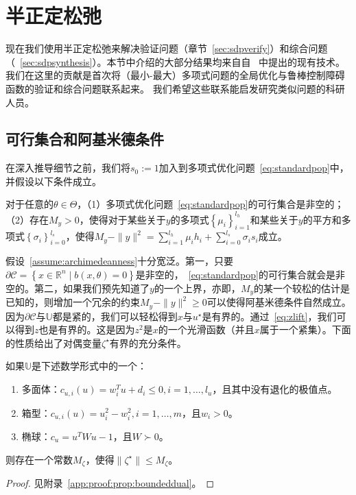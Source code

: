 
\chapter{半正定松弛}
\label{sec:sdprelax}

现在我们使用半正定松弛来解决验证问题（章节~\ref{sec:sdpverify}）和综合问题（~\ref{sec:sdpsynthesis}）。本节中介绍的大部分结果均来自自~\cite{lasserre01siopt-global,lasserre11jgo-minmaxpop} 中提出的现有技术。 我们在这里的贡献是首次将（最小-最大）多项式问题的全局优化与鲁棒控制障碍函数的验证和综合问题联系起来。 我们希望这些联系能启发研究类似问题的科研人员。

\section{可行集合和阿基米德条件}
在深入推导细节之前，我们将$s_0 := 1$加入到多项式优化问题~\eqref{eq:standardpop}中，并假设以下条件成立。
\begin{assumption}[可行性和阿基米德条件]\label{assume:archimedeanness}
    对于任意的$\theta \in \Theta$，（1）多项式优化问题~\eqref{eq:standardpop}的可行集合是非空的；（2）存在$M_y > 0$，使得对于某些关于$y$的多项式$\left\{ \mu_i \right\}_{i=1}^{l_h}$和某些关于$y$的平方和多项式$\left\{ \sigma_i \right\}_{i=0}^{l_s}$，使得$M_y - \parallel y \parallel^2 = \sum_{i=1}^{l_h} \mu_i h_i + \sum_{i=0}^{l_s} \sigma_i s_i$成立。
\end{assumption}

假设~\ref{assume:archimedeanness}十分宽泛。第一，只要$\partial \mathcal{C} = \left\{ x \in \mathbb{R}^n \mid b(x, \theta) = 0 \right\}$是非空的，~\eqref{eq:standardpop}的可行集合就会是非空的。第二，如果我们预先知道了$y$的一个上界，亦即，$M_y$的某一个较松的估计是已知的，则增加一个冗余的约束$M_y - \parallel y \parallel^2 \ge 0$可以使得阿基米德条件自然成立。因为$\partial \mathcal{C}$与$\mathbb{U}$都是紧的，我们可以轻松得到$x$与$u^\star$是有界的。通过~\eqref{eq:zlift}，我们可以得到$z$也是有界的。这是因为$z^2$是$x$的一个光滑函数（并且$x$属于一个紧集）。下面的性质给出了对偶变量$\zeta^\star$有界的充分条件。

\begin{proposition}\label{prop:boundeddual}
    如果$\mathbb{U}$是下述数学形式中的一个：
    \begin{enumerate}
        \item 多面体：$c_{u,i}(u) = w_i^T u + d_i \le 0, i = 1, \dots, l_u$，且其中没有退化的极值点。
        \item 箱型：$c_{u,i}(u) = u_i^2 - w_i^2, i = 1, \dots, m$，且$w_i > 0$。
        \item 椭球：$c_u = u^T W u - 1$，且$W \succ 0$。
    \end{enumerate}
    则存在一个常数$M_\zeta$，使得$\parallel \zeta^\star \parallel \le M_\zeta$。
\end{proposition}
\begin{proof}
    见附录~\ref{app:proof:prop:boundeddual}。
\end{proof}


